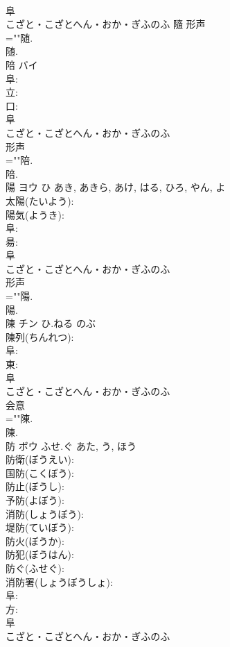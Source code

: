 \documentclass[8pt]{extreport}
\begin{document}
\begin{CJK}{UTF8}{min}
\\	阜	
\\	こざと・こざとへん・おか・ぎふのふ	隨	形声 
\\	=""随.
\\	随.
\\	陪	バイ			
\\	阜: 
\\	立: 
\\	口: 
\\	阜	
\\	こざと・こざとへん・おか・ぎふのふ	
\\	形声 
\\	=""陪.
\\	陪.
\\	陽	ヨウ	ひ	あき, あきら, あけ, はる, ひろ, やん, よ	
\\	太陽(たいよう): 
\\	陽気(ようき): 
\\	阜: 
\\	昜: 
\\	阜	
\\	こざと・こざとへん・おか・ぎふのふ	
\\	形声 
\\	=""陽.
\\	陽.
\\	陳	チン	ひ.ねる	のぶ	
\\	陳列(ちんれつ): 
\\	阜: 
\\	東: 
\\	阜	
\\	こざと・こざとへん・おか・ぎふのふ	
\\	会意 
\\	=""陳.
\\	陳.
\\	防	ボウ	ふせ.ぐ	あた, う, ほう	
\\	防衛(ぼうえい): 
\\	国防(こくぼう): 
\\	防止(ぼうし): 
\\	予防(よぼう): 
\\	消防(しょうぼう): 
\\	堤防(ていぼう): 
\\	防火(ぼうか): 
\\	防犯(ぼうはん): 
\\	防ぐ(ふせぐ): 
\\	消防署(しょうぼうしょ): 
\\	阜: 
\\	方: 
\\	阜	
\\	こざと・こざとへん・おか・ぎふのふ	

\end{CJK}
\end{document}
